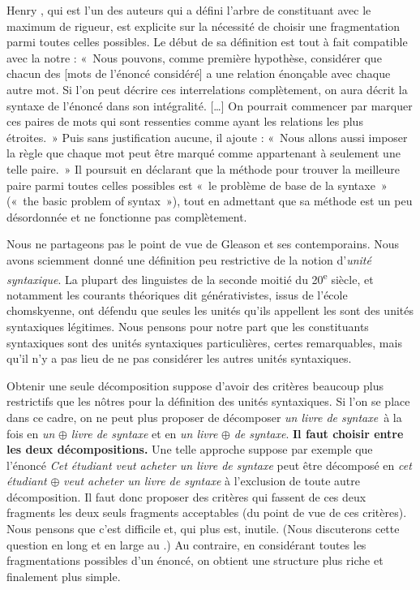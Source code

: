 Henry \citet{gleason1955introduction}, qui est l’un des auteurs qui a défini l’arbre de constituant avec le maximum de rigueur, est explicite sur la nécessité de choisir une fragmentation parmi toutes celles possibles. Le début de sa définition est tout à fait compatible avec la notre : «~Nous pouvons, comme première hypothèse, considérer que chacun des [mots de l’énoncé considéré] a une relation énonçable avec chaque autre mot. Si l’on peut décrire ces interrelations complètement, on aura décrit la syntaxe de l’énoncé dans son intégralité. […] On pourrait commencer par marquer ces paires de mots qui sont ressenties comme ayant les relations les plus étroites.~» Puis sans justification aucune, il ajoute : «~Nous allons aussi imposer la règle que chaque mot peut être marqué comme appartenant à seulement une telle paire.~» Il poursuit en déclarant que la méthode pour trouver la meilleure paire parmi toutes celles possibles est «~le problème de base de la syntaxe~» («~the basic problem of syntax~»), tout en admettant que sa méthode est un peu désordonnée et ne fonctionne pas complètement.

Nous ne partageons pas le point de vue de Gleason et ses contemporains. Nous avons sciemment donné une définition peu restrictive de la notion d’\textit{unité syntaxique}. La plupart des linguistes de la seconde moitié du 20\textsuperscript{e} siècle, et notamment les courants théoriques dit générativistes, issus de l’école chomskyenne, ont défendu que seules les unités qu’ils appellent les  sont des unités syntaxiques légitimes. Nous pensons pour notre part que les constituants syntaxiques sont des unités syntaxiques particulières, certes remarquables, mais qu’il n’y a pas lieu de ne pas considérer les autres unités syntaxiques.

Obtenir une seule décomposition suppose d’avoir des critères beaucoup plus restrictifs que les nôtres pour la définition des unités syntaxiques. Si l’on se place dans ce cadre, on ne peut plus proposer de décomposer \textit{un livre de syntaxe}~à la fois en \textit{un} ${\oplus}$ \textit{livre de syntaxe} et en \textit{un livre} ${\oplus}$ \textit{de syntaxe}. \textbf{Il faut choisir entre les deux décompositions.} Une telle approche suppose par exemple que l’énoncé \textit{Cet étudiant veut acheter un livre de syntaxe} peut être décomposé en \textit{cet étudiant} ${\oplus}$ \textit{veut acheter un livre de syntaxe} à l’exclusion de toute autre décomposition. Il faut donc proposer des critères qui fassent de ces deux fragments les deux seuls fragments acceptables (du point de vue de ces critères). Nous pensons que c’est difficile et, qui plus est, inutile. (Nous discuterons cette question en long et en large au .) Au contraire, en considérant toutes les fragmentations possibles d’un énoncé, on obtient une structure plus riche et finalement plus simple.

